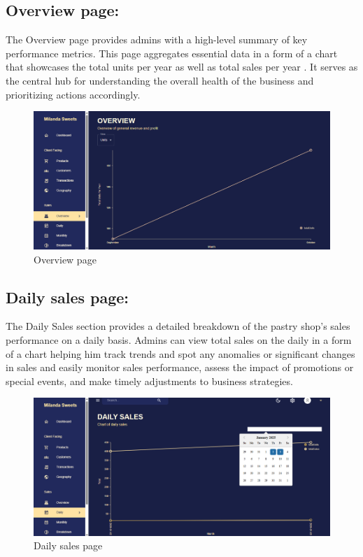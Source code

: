 \subsection{Overview page:}

The Overview page provides admins with a high-level summary of key performance metrics. This page aggregates essential data in a form of a chart that showcases the total units per year as well as total sales per year . It serves as the central hub for understanding the overall health of the business and prioritizing actions accordingly.

\begin{figure}[!h]
\begin{center}
\includegraphics{images/Overview page.png}
\end{center}
\caption{Overview page}
\end{figure}

\newpage
\subsection{Daily sales page:}

The Daily Sales section provides a detailed breakdown of the pastry shop’s sales performance on a daily basis. Admins can view total sales on the daily in a form of a chart helping him track trends and spot any anomalies or significant changes in sales and easily monitor sales performance, assess the impact of promotions or special events, and make timely adjustments to business strategies.

\begin{figure}[!h]
\begin{center}
\includegraphics{images/Daily sales page.png}
\end{center}
\caption{Daily sales page}
\end{figure}

